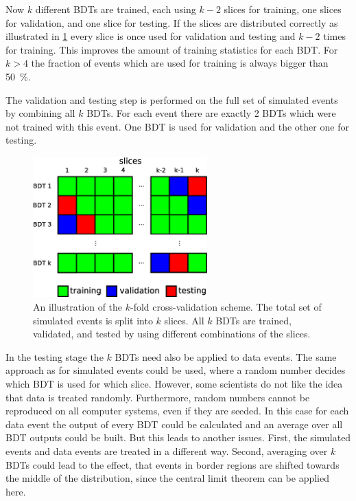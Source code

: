 Now $k$ different BDTs are trained, each using $k-2$ slices for training, one slices for validation, and one slice for testing.
If the slices are distributed correctly as illustrated in \cref{fig:mva:kfold-xval} every slice is once used for validation
and testing and $k - 2$ times for training.
This improves the amount of training statistics for each BDT\@.
For $k > 4$ the fraction of events which are used for training is always bigger than \SI{50}{\percent}.

The validation and testing step is performed on the full set of simulated events by combining all $k$ BDTs.
For each event there are exactly 2 BDTs which were not trained with this event.
One BDT is used for validation and the other one for testing.

\begin{figure}[htb]
    \centering
    \includegraphics[width=0.6\textwidth]{./figures/mva/kfold-xval.eps}
    \caption{An illustration of the $k$-fold cross-validation scheme. The total set of simulated events is split into $k$ slices.
             All $k$ BDTs are trained, validated, and tested by using different combinations of the slices.}\label{fig:mva:kfold-xval}
\end{figure}

In the testing stage the $k$ BDTs need also be applied to data events.
The same approach as for simulated events could be used, where
a random number decides which BDT is used for which slice.
However, some scientists do not like the idea that data is treated randomly.
Furthermore, random numbers cannot be reproduced on all computer systems, even if they are seeded.
In this case for each data event the output of every BDT could be calculated
and an average over all BDT outputs could be built.
But this leads to another issues.
First, the simulated events and data events are treated in a different way.
Second, averaging over $k$ BDTs could lead to the effect, that events in border regions
are shifted towards the middle of the distribution, since the central limit theorem can be applied here.

